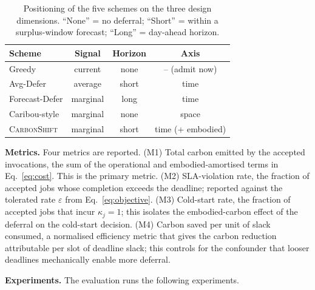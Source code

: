 \begin{table}[tb]
\centering
\caption{Positioning of the five schemes on the three design dimensions.
``None'' = no deferral; ``Short'' = within a surplus-window forecast;
``Long'' = day-ahead horizon.}
\label{tab:baselines}
\small
\begin{tabular}{@{}lccc@{}}
\toprule
Scheme & Signal & Horizon & Axis \\
\midrule
Greedy           & current    & none  & -- (admit now) \\
Avg-Defer        & average    & short & time \\
Forecast-Defer   & marginal   & long  & time \\
Caribou-style    & marginal   & none  & space \\
\textsc{CarbonShift} & marginal & short & time (+ embodied) \\
\bottomrule
\end{tabular}
\end{table}

\textbf{Metrics.}
Four metrics are reported. (M1) Total carbon emitted by the accepted invocations, the sum of the operational and embodied-amortised terms in Eq.~\eqref{eq:cost}. This is the primary metric. (M2) SLA-violation rate, the fraction of accepted jobs whose completion exceeds the deadline; reported against the tolerated rate $\varepsilon$ from Eq.~\eqref{eq:objective}. (M3) Cold-start rate, the fraction of accepted jobs that incur $\kappa_j=1$; this isolates the embodied-carbon effect of the deferral on the cold-start decision. (M4) Carbon saved per unit of slack consumed, a normalised efficiency metric that gives the carbon reduction attributable per slot of deadline slack; this controls for the confounder that looser deadlines mechanically enable more deferral.

\textbf{Experiments.}
The evaluation runs the following experiments.

